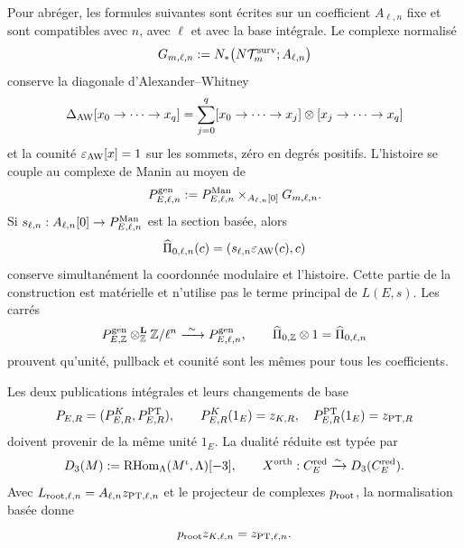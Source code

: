 Pour abréger, les formules suivantes sont écrites sur un coefficient
$A_{\ell,n}$ fixe et sont compatibles avec $n$, avec $\ell$ et avec la base
intégrale. Le complexe normalisé
\begin{equation}\label{eq:pdf2-bsd-gmn}
 G_{m,\ell,n}:=N_*\bigl(N\mathcal T_m^{\rm surv};A_{\ell,n}\bigr)
\end{equation}
conserve la diagonale d'Alexander--Whitney
\begin{equation}\label{eq:pdf2-bsd-aw}
 \Delta_{\rm AW}[x_0\to\cdots\to x_q]
 =\sum_{j=0}^q[x_0\to\cdots\to x_j]\otimes
                [x_j\to\cdots\to x_q]
\end{equation}
et la counité
$\varepsilon_{\rm AW}[x]=1$ sur les sommets, zéro en degrés positifs. L'histoire
se couple au complexe de Manin au moyen de
\begin{equation}\label{eq:pdf2-bsd-pullback}
 P_{E,\ell,n}^{\rm gen}:=
 P_{E,\ell,n}^{\rm Man}\times_{A_{\ell,n}[0]}G_{m,\ell,n}.
\end{equation}
Si $s_{\ell,n}:A_{\ell,n}[0]\to P_{E,\ell,n}^{\rm Man}$ est la section
basée, alors
\[
 \widehat\Pi_{0,\ell,n}(c)=
 (s_{\ell,n}\varepsilon_{\rm AW}(c),c)
\]
conserve simultanément la coordonnée modulaire et l'histoire. Cette partie de la
construction est matérielle et n'utilise pas le terme principal de $L(E,s)$. Les
carrés
\begin{equation}\label{eq:pdf2-bsd-pullback-base-change}
 P_{E,\mathbb Z}^{\rm gen}\otimes_{\mathbb Z}^{\mathbf L}
      \mathbb Z/\ell^n
 \xrightarrow{\ \sim\ }P_{E,\ell,n}^{\rm gen},
 \qquad
 \widehat\Pi_{0,\mathbb Z}\otimes1=\widehat\Pi_{0,\ell,n}
\end{equation}
prouvent qu'unité, pullback et counité sont les mêmes pour tous les
coefficients.

Les deux publications intégrales et leurs changements de base
\begin{equation}\label{eq:pdf2-bsd-copub}
 P_{E,R}=(P_{E,R}^K,P_{E,R}^{\rm PT}),
 \qquad P_{E,R}^K(1_E)=z_{K,R},\quad
 P_{E,R}^{\rm PT}(1_E)=z_{{\rm PT},R}
\end{equation}
doivent provenir de la même unité $1_E$. La dualité réduite est typée par
\[
 D_3(M):=\operatorname{RHom}_\Lambda(M^\iota,\Lambda)[-3],
 \qquad
 X^{\rm orth}:C_E^{\rm red}\xrightarrow{\sim}D_3(C_E^{\rm red}).
\]
Avec $L_{{\rm root},\ell,n}=A_{\ell,n}z_{{\rm PT},\ell,n}$ et le projecteur de complexes
$p_{\rm root}$, la normalisation basée donne
\begin{equation}\label{eq:pdf2-bsd-raiz}
 p_{\rm root}z_{K,\ell,n}=z_{{\rm PT},\ell,n}.
\end{equation}

